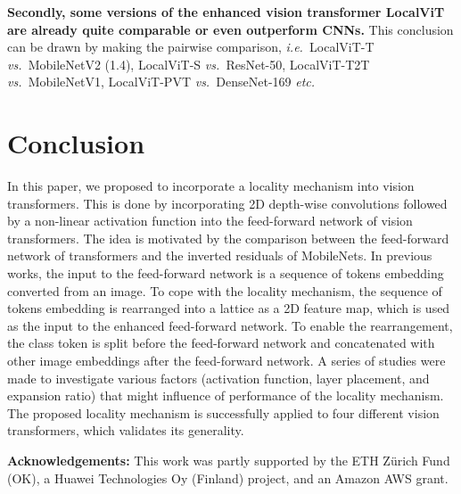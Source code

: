 \documentclass[10pt,twocolumn,letterpaper]{article}
\def\vs{\emph{vs.\ }}
\def\ie{\emph{i.e.\ }}
\def\etc{\emph{etc.\ }}
\begin{document}
\textbf{Secondly, some versions of the enhanced vision transformer LocalViT are already quite comparable or even outperform CNNs.} This conclusion can be drawn by making the pairwise comparison, \ie LocalViT-T \vs MobileNetV2 (1.4), LocalViT-S \vs ResNet-50, LocalViT-T2T \vs MobileNetV1, LocalViT-PVT \vs DenseNet-169 \etc




\section{Conclusion}
\label{sec:conclusion}


In this paper, we proposed to incorporate a locality mechanism into vision transformers. This is done by incorporating 2D depth-wise convolutions followed by a non-linear activation function into the feed-forward network of vision transformers. The idea is motivated by the comparison between the feed-forward network of transformers and the inverted residuals of MobileNets. In previous works, the input to the feed-forward network is a sequence of tokens embedding converted from an image. To cope with the locality mechanism, the sequence of tokens embedding is rearranged into a lattice as a 2D feature map, which is used as the input to the enhanced feed-forward network. To enable the rearrangement, the class token is split before the feed-forward network and concatenated with other image embeddings after the feed-forward network. A series of studies were made to investigate various factors (activation function, layer placement, and expansion ratio) that might influence of performance of the locality mechanism. The proposed locality mechanism is successfully applied to four different vision transformers, which validates its generality.



\vspace{0.1cm}
\noindent \textbf{Acknowledgements:} This work was partly supported by the ETH Z\"urich Fund (OK), a Huawei Technologies Oy (Finland) project, and an Amazon AWS grant.



{\small


}
\end{document}

